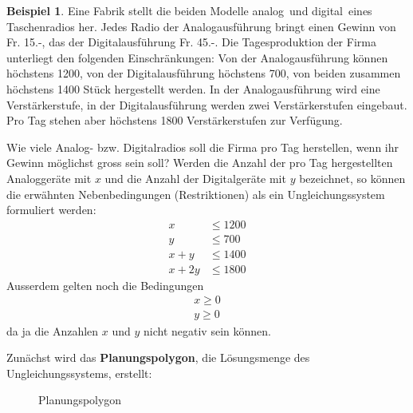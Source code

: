 \documentclass[%
11pt,%
twoside,%
titlepage,%
swissgerman,%
headsepline%
]{scrartcl}
\theoremstyle{definition}
\newtheorem{bsp}{Beispiel}[subsection] %
\theoremstyle{plain}
\begin{document}
\begin{bsp}
Eine Fabrik stellt die beiden Modelle \glqq analog\grqq\ und \glqq digital\grqq\ eines Taschenradios her. Jedes Radio der Analogausführung bringt einen Gewinn von Fr. 15.-, das der Digitalausführung Fr. 45.-.
Die Tagesproduktion der Firma unterliegt den folgenden Einschränkungen: Von der Analogausführung können höchstens 1200, von der Digitalausführung höchstens 700, von beiden zusammen höchstens 1400 Stück hergestellt werden. In der Analogausführung wird eine Verstärkerstufe, in der Digitalausführung werden zwei Verstärkerstufen eingebaut. Pro Tag stehen aber höchstens 1800 Verstärkerstufen zur Verfügung.

Wie viele Analog- bzw. Digitalradios soll die Firma pro Tag herstellen, wenn ihr Gewinn möglichst gross sein soll?
Werden die Anzahl der pro Tag hergestellten Analoggeräte mit $x$ und die Anzahl der Digitalgeräte mit $y$ bezeichnet, so können die erwähnten Nebenbedingungen (Restriktionen) als ein Ungleichungssystem formuliert werden:
\begin{align}
x&\leq1200\\
y&\leq700\\
x+y&\leq1400\\
x+2y&\leq1800
\end{align}
Ausserdem gelten noch die Bedingungen
\begin{align*}
x\geq0\\
y\geq0
\end{align*}
da ja die Anzahlen $x$ und $y$ nicht negativ sein können.

Zunächst wird das \textbf{Planungspolygon}, die Lösungsmenge des Ungleichungssystems, erstellt:
\begin{figure}[h!]
\begin{center}
\end{center}
\caption{Planungspolygon}
\end{figure}


\end{bsp}
\end{document}
